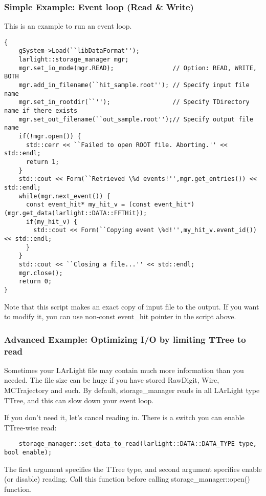 \subsubsection{Simple Example: Event loop (Read \& Write)}
This is an example to run an event loop.
\begin{lstlisting}
{
    gSystem->Load(``libDataFormat'');
    larlight::storage_manager mgr;
    mgr.set_io_mode(mgr.READ);                // Option: READ, WRITE, BOTH
    mgr.add_in_filename(``hit_sample.root''); // Specify input file name
    mgr.set_in_rootdir(``'');                 // Specify TDirectory name if there exists
    mgr.set_out_filename(``out_sample.root'');// Specify output file name
    if(!mgr.open()) {
      std::cerr << ``Failed to open ROOT file. Aborting.'' << std::endl;
      return 1;
    }
    std::cout << Form(``Retrieved \%d events!'',mgr.get_entries()) << std::endl;
    while(mgr.next_event()) {
      const event_hit* my_hit_v = (const event_hit*)(mgr.get_data(larlight::DATA::FFTHit));
      if(my_hit_v) {
        std::cout << Form(``Copying event \%d!'',my_hit_v.event_id()) << std::endl;
      }
    }
    std::cout << ``Closing a file...'' << std::endl;
    mgr.close();
    return 0;
}
\end{lstlisting}
Note that this script makes an exact copy of input file to the output.
If you want to modify it, you can use non-const {\ttfamily event\_hit} pointer in the script above.

\subsubsection{Advanced Example: Optimizing I/O by limiting TTree to read}
Sometimes your LArLight file may contain much more information than you needed.
The file size can be huge if you have stored {\ttfamily RawDigit, Wire, MCTrajectory} and such.
By default, {\ttfamily storage\_manager} reads in all LArLight type {\ttfamily TTree}, and
this can slow down your event loop.

If you don't need it, let's cancel reading in. There is a switch you can enable TTree-wise
read:
\begin{lstlisting}
    storage_manager::set_data_to_read(larlight::DATA::DATA_TYPE type, bool enable);
\end{lstlisting}
The first argument specifies the {\ttfamily TTree} type, and second argument specifies enable (or disable) reading.
Call this function before calling {\ttfamily storage\_manager::open()} function.




